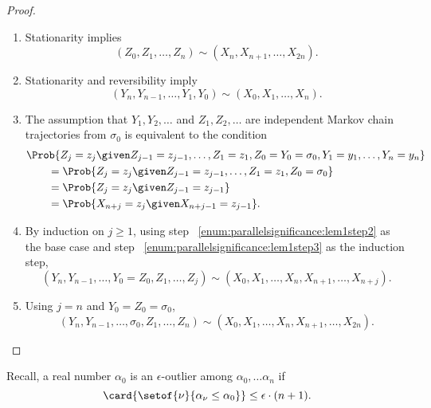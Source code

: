 \documentclass[12pt]{article}
\begin{document}
\begin{proof}
    \begin{enumerate}
        \item
            Stationarity implies
            \[
                (Z_0, Z_1, \dots, Z_n) \sim (X_n, X_{n+1}, \dots, X_{2n}).
            \]
        \item
            \label{enum:parallelsignificance:lem1step2} Stationarity and
            reversibility imply
            \[
                (Y_n, Y_{n-1}, \dots, Y_1, Y_0) \sim (X_0, X_1, \dots, X_n).
            \]
        \item
            \label{enum:parallelsignificance:lem1step3} The assumption
            that \( Y_1, Y_2, \dots \) and \( Z_1, Z_2, \dots \) are
            independent Markov chain trajectories from \( \sigma_0 \) is
            equivalent to the condition
            \begin{align*}
                & \Prob{ Z_j = z_j \given Z_{j-1} = z_{j-1}, \dots, Z_1
                = z_1, Z_0 = Y_0=\sigma_0, Y_1=y_1, \dots, Y_n = y_n} \\
                & \qquad = \Prob{ Z_j = z_j \given Z_{j-1} = z_{j-1},
                \dots, Z_1 = z_1, Z_0 = \sigma_0} \\
                & \qquad = \Prob{ Z_j = z_j \given Z_{j-1} = z_{j-1}} \\
                &\qquad = \Prob{ X_{n+j} = z_j \given X_{n+j-1} = z_{j-1}}.
            \end{align*}
        \item
            By induction on \( j \ge 1 \), using step~%
            \ref{enum:parallelsignificance:lem1step2} as the base case
            and step~%
            \ref{enum:parallelsignificance:lem1step3} as the induction
            step,
            \[
                (Y_n, Y_{n-1}, \dots, Y_0=Z_0, Z_1, \dots, Z_j) \sim (X_0,
                X_1, \dots, X_n, X_{n+1}, \dots, X_{n+j}).
            \]
        \item
            Using \( j = n \) and \( Y_0 = Z_0 = \sigma_0 \),
            \[
                (Y_n, Y_{n-1}, \dots, \sigma_0, Z_1, \dots, Z_n) \sim (X_0,
                X_1, \dots, X_n, X_{n+1}, \dots, X_{2n}).
            \]
    \end{enumerate}
\end{proof}

Recall, a real number \( \alpha_0 \) is an \( \epsilon \)-outlier among \(
\alpha_0, \dots \alpha_n \) if
\[
    \card{\setof{\nu}{ \alpha_{\nu} \le \alpha_0 }} \le \epsilon \cdot (n+1).
\]
\end{document}
